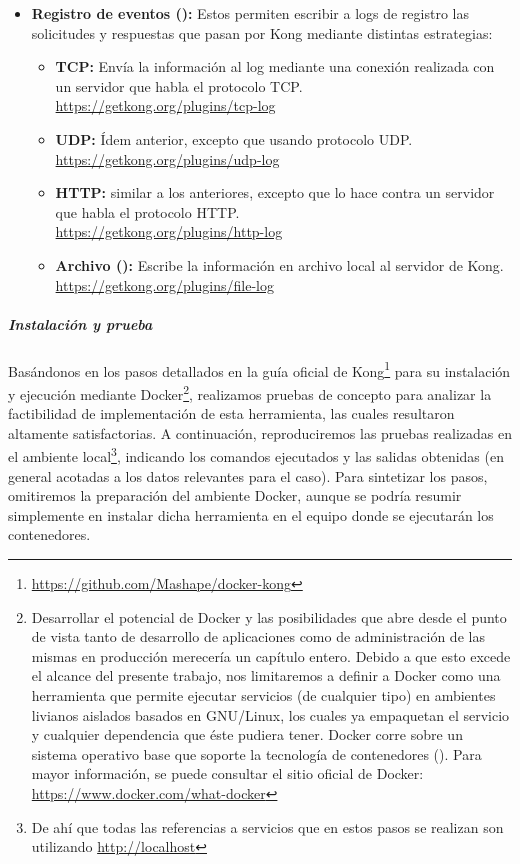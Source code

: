 \begin{itemize}
  \item \textbf{Registro de eventos ():} Estos  permiten escribir a logs de registro las solicitudes y respuestas que pasan por Kong mediante distintas estrategias:
  \begin{itemize}
    \item \textbf{TCP:} Envía la información al log mediante una conexión realizada con un servidor que habla el protocolo TCP. \\
    \url{https://getkong.org/plugins/tcp-log}
    \item \textbf{UDP:} Ídem anterior, excepto que usando protocolo UDP. \\
    \url{https://getkong.org/plugins/udp-log}
    \item \textbf{HTTP:}  similar a los anteriores, excepto que lo hace contra un servidor que habla el protocolo HTTP. \\
    \url{https://getkong.org/plugins/http-log}
    \item \textbf{Archivo ():} Escribe la información en archivo local al servidor de Kong. \\
    \url{https://getkong.org/plugins/file-log}
  \end{itemize}
\end{itemize}

\subparagraph{Instalación y prueba}

Basándonos en los pasos detallados en la guía oficial de Kong\footnote{\url{https://github.com/Mashape/docker-kong}} para su instalación y ejecución mediante Docker\footnote{Desarrollar el potencial de Docker y las posibilidades que abre desde el punto de vista tanto de desarrollo de aplicaciones como de administración de las mismas en producción merecería un capítulo entero. Debido a que esto excede el alcance del presente trabajo, nos limitaremos a definir a Docker como una herramienta que permite ejecutar servicios (de cualquier tipo) en ambientes livianos aislados basados en GNU/Linux, los cuales ya empaquetan el servicio y cualquier dependencia que éste pudiera tener. Docker corre sobre un sistema operativo base que soporte la tecnología de contenedores (). Para mayor información, se puede consultar el sitio oficial de Docker: \url{https://www.docker.com/what-docker}}, realizamos pruebas de concepto para analizar la factibilidad de implementación de esta herramienta, las cuales resultaron altamente satisfactorias. A continuación, reproduciremos las pruebas realizadas en el ambiente local\footnote{De ahí que todas las referencias a servicios que en estos pasos se realizan son utilizando \url{http://localhost}}, indicando los comandos ejecutados y las salidas obtenidas (en general acotadas a los datos relevantes para el caso). Para sintetizar los pasos, omitiremos la preparación del ambiente Docker, aunque se podría resumir simplemente en instalar dicha herramienta en el equipo donde se ejecutarán los contenedores.

